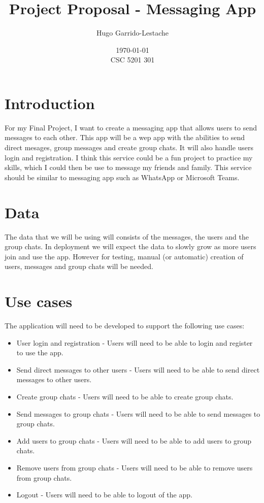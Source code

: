 \documentclass[12pt]{Article}
\title{Project Proposal - Messaging App}
\author{
    Hugo Garrido-Lestache
}
\date{\today \\ CSC 5201 301}
\begin{document}
\maketitle
\section*{Introduction}
For my Final Project, I want to create a messaging app that allows users to send messages to each other.
This app will be a wep app with the abilities to send direct mesages, group messages and create group chats.
It will also handle users login and registration.
I think this service could be a fun project to practice my skills, 
which I could then be use to message my friends and family.
This service should be similar to messaging app such as WhatsApp or Microsoft Teams.

\section{Data}
The data that we will be using will consists of the messages, the users and the group chats.
In deployment we will expect the data to slowly grow as more users join and use the app.
However for testing, manual (or automatic) creation of users, messages and group chats will be needed.

\section{Use cases}
The application will need to be developed to support the following use cases:

\begin{itemize}
    \item User login and registration - Users will need to be able to login and register to use the app.
    \item Send direct messages to other users - Users will need to be able to send direct messages to other users.
    \item Create group chats - Users will need to be able to create group chats.
    \item Send messages to group chats - Users will need to be able to send messages to group chats.
    \item Add users to group chats - Users will need to be able to add users to group chats.
    \item Remove users from group chats - Users will need to be able to remove users from group chats.
    \item Logout - Users will need to be able to logout of the app.
\end{itemize}
\end{document}
